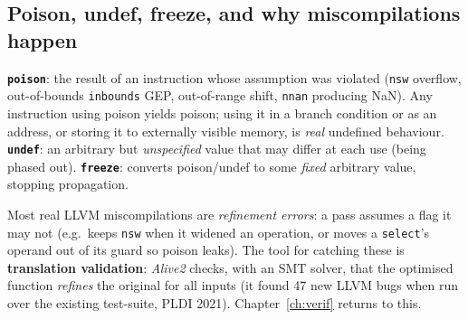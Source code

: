 \documentclass[10pt,a4paper,openany,oneside]{report}
\begin{document}
\subsection{Poison, undef, freeze, and why miscompilations happen}
\begin{defbox}
\textbf{\texttt{poison}}: the result of an instruction whose assumption was violated (\texttt{nsw} overflow, out-of-bounds \texttt{inbounds} GEP, out-of-range shift, \texttt{nnan} producing NaN). Any instruction using poison yields poison; using it in a branch condition or as an address, or storing it to externally visible memory, is \emph{real} undefined behaviour. \textbf{\texttt{undef}}: an arbitrary but \emph{unspecified} value that may differ at each use (being phased out). \textbf{\texttt{freeze}}: converts poison/undef to some \emph{fixed} arbitrary value, stopping propagation.
\end{defbox}
Most real LLVM miscompilations are \emph{refinement errors}: a pass assumes a flag it may not (e.g.\ keeps \texttt{nsw} when it widened an operation, or moves a \texttt{select}'s operand out of its guard so poison leaks). The tool for catching these is \textbf{translation validation}: \emph{Alive2} checks, with an SMT solver, that the optimised function \emph{refines} the original for all inputs (it found 47 new LLVM bugs when run over the existing test-suite, PLDI 2021). Chapter~\ref{ch:verif} returns to this.
\end{document}
